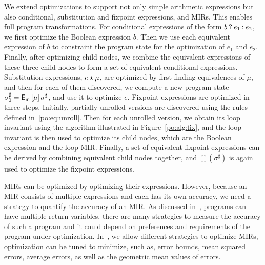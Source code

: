 We extend optimizations to support not only simple arithmetic expressions
but also conditional, substitution and fixpoint expressions, and MIRs.  This
enables full program transformations.  For conditional expressions of the form
$b\mathbin{?} e_1\mathbin{:} e_2$, we first optimize the Boolean expression $b$.  Then
we use each equivalent expression of $b$ to constraint the program state for
the optimization of $e_1$ and $e_2$.  Finally, after optimizing child nodes,
we combine the equivalent expressions of these three child nodes to form a
set of equivalent conditional expressions.  Substitution expressions, $e
\mathbin{\star} \mu$, are optimized by first finding equivalences of $\mu$, and then
for each of them discovered, we compute a new program state $\sigma^\sharp_0
= \operatorname{\mathsf{E}_\mathsf{m}}\left[{\mu}\right] \sigma^\sharp$, and use it to optimize $e$.  Fixpoint
expressions are optimized in three steps.  Initially, partially unrolled
versions are discovered using the rules defined in~\eqref{po:eq:unroll}.  Then
for each unrolled version, we obtain its loop invariant using the algorithm
illustrated in Figure~\ref{po:alg:fix}, and the loop invariant is then used to
optimize its child nodes, which are the Boolean expression and the loop MIR\@.
Finally, a set of equivalent fixpoint expressions can be derived by combining
equivalent child nodes together, and $\closure(\sigma^\sharp)$ is again used to
optimize the fixpoint expressions.

MIRs can be optimized by optimizing their expressions.  However, because
an MIR consists of multiple expressions and each has its own accuracy,
we need a strategy to quantify the accuracy of an MIR\@.  As discussed
in~\cite{martel09}, programs can have multiple return variables, there are many
strategies to measure the accuracy of such a program and it could depend on
preferences and requirements of the program under optimization.  In~\newsoap,
we allow different strategies to optimize MIRs, optimization can be tuned to
minimize, such as, error bounds, mean squared errors, average errors, as well
as the geometric mean values of errors.
